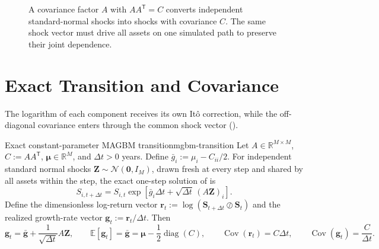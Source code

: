 \documentclass[11pt]{article}
\newcommand{\E}{\mathbb{E}}
\newcommand{\Cov}{\operatorname{Cov}}
\newcommand{\R}{\mathbb{R}}
\begin{document}
\begin{figure}[ht]
  \centering
  \caption{A covariance factor $A$ with $AA^{\mathsf T}=C$ converts independent standard-normal shocks into shocks with covariance $C$. The same shock vector must drive all assets on one simulated path to preserve their joint dependence.}
  \label{fig:correlated-shocks}
\end{figure}

\section{Exact Transition and Covariance}

The logarithm of each component receives its own It\^o correction, while the off-diagonal covariance enters through the common shock vector ().

\begin{proposition}{Exact constant-parameter MAGBM transition}{mgbm-transition}
Let $A\in\R^{M\times M}$, $C:=AA^{\mathsf T}$, $\boldsymbol\mu\in\R^M$, and $\Delta t>0$ years. Define $\bar g_i:=\mu_i-C_{ii}/2$. For independent standard normal shocks $\mathbf Z\sim\mathcal N(\mathbf0,I_M)$, drawn fresh at every step and shared by all assets within the step, the exact one-step solution of  is
\begin{equation}
  \label{eq:mgbm-transition}
  S_{i,t+\Delta t}=S_{i,t}\exp\!\left[
  \bar g_i\Delta t
  +\sqrt{\Delta t}\,(A\mathbf Z)_i
  \right].
\end{equation}
Define the dimensionless log-return vector $\mathbf r_t:=\log(\mathbf S_{t+\Delta t}\oslash\mathbf S_t)$ and the realized growth-rate vector $\mathbf g_t:=\mathbf r_t/\Delta t$. Then
\begin{equation}
  \label{eq:mgbm-log-covariance}
  \mathbf g_t=\bar{\mathbf g}+\frac{1}{\sqrt{\Delta t}}A\mathbf Z,
  \qquad
  \E[\mathbf g_t]=\bar{\mathbf g}=\boldsymbol\mu-\frac12\operatorname{diag}(C),
  \qquad
  \Cov(\mathbf r_t)=C\Delta t,
  \qquad
  \Cov(\mathbf g_t)=\frac{C}{\Delta t}.
\end{equation}
\end{proposition}
\end{document}
